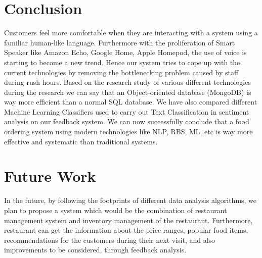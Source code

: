 \documentclass[conference]{IEEEtran}
\begin{document}
\section{Conclusion}
 Customers feel more comfortable when they are interacting with a system using a familiar human-like language. Furthermore with the proliferation of Smart Speaker like Amazon Echo, Google Home, Apple Homepod, the use of voice is starting to become
 a new trend. Hence our system tries to cope up with the current technologies by removing the bottlenecking problem caused by staff during rush hours. Based on the research study of various different technologies during the research we can say that
 an Object-oriented database (MongoDB) is way more efficient than a normal SQL database. We have also compared different Machine Learning Classifiers used to carry out Text Classification in sentiment analysis on our feedback system. We can now successfully conclude that a food ordering system using modern technologies like NLP, RBS, ML, etc is way more effective and systematic than traditional systems. 

\section{Future Work}

	In the future, by following the footprints of different data analysis algorithms, we plan to propose a system which would be the combination of restaurant management  system and inventory management of the restaurant. 
	Furthermore, restaurant can get the information about the price ranges, popular food items, recommendations for the customers during their next visit, and also improvements to be considered, through feedback analysis.
	
\end{document}
